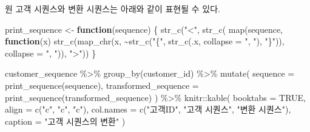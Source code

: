 \documentclass[
]{book}
\newenvironment{Shaded}{\begin{snugshade}}{\end{snugshade}}
\newcommand{\AttributeTok}[1]{\textcolor[rgb]{0.77,0.63,0.00}{#1}}
\newcommand{\ConstantTok}[1]{\textcolor[rgb]{0.00,0.00,0.00}{#1}}
\newcommand{\ControlFlowTok}[1]{\textcolor[rgb]{0.13,0.29,0.53}{\textbf{#1}}}
\newcommand{\FunctionTok}[1]{\textcolor[rgb]{0.00,0.00,0.00}{#1}}
\newcommand{\NormalTok}[1]{#1}
\newcommand{\OtherTok}[1]{\textcolor[rgb]{0.56,0.35,0.01}{#1}}
\newcommand{\SpecialCharTok}[1]{\textcolor[rgb]{0.00,0.00,0.00}{#1}}
\newcommand{\StringTok}[1]{\textcolor[rgb]{0.31,0.60,0.02}{#1}}
\begin{document}
\begin{Shaded}
\end{Shaded}

원 고객 시퀀스와 변환 시퀀스는 아래와 같이 표현될 수 있다.

\begin{Shaded}
\begin{Highlighting}[]
\NormalTok{print\_sequence }\OtherTok{\textless{}{-}} \ControlFlowTok{function}\NormalTok{(sequence) \{}
  \FunctionTok{str\_c}\NormalTok{(}\StringTok{"\textless{}"}\NormalTok{, }\FunctionTok{str\_c}\NormalTok{(}
    \FunctionTok{map}\NormalTok{(sequence, }\ControlFlowTok{function}\NormalTok{(x) }
      \FunctionTok{str\_c}\NormalTok{(}\FunctionTok{map\_chr}\NormalTok{(x, }\SpecialCharTok{\textasciitilde{}}\FunctionTok{str\_c}\NormalTok{(}\StringTok{"\{"}\NormalTok{, }\FunctionTok{str\_c}\NormalTok{(.x, }\AttributeTok{collapse =} \StringTok{", "}\NormalTok{), }\StringTok{"\}"}\NormalTok{)), }
            \AttributeTok{collapse =} \StringTok{", "}\NormalTok{)),}
    \StringTok{"\textgreater{}"}\NormalTok{))}
\NormalTok{\}}

\NormalTok{customer\_sequence }\SpecialCharTok{\%\textgreater{}\%}
  \FunctionTok{group\_by}\NormalTok{(customer\_id) }\SpecialCharTok{\%\textgreater{}\%}
  \FunctionTok{mutate}\NormalTok{(}
    \AttributeTok{sequence =} \FunctionTok{print\_sequence}\NormalTok{(sequence),}
    \AttributeTok{transformed\_sequence =} \FunctionTok{print\_sequence}\NormalTok{(transformed\_sequence)}
\NormalTok{  ) }\SpecialCharTok{\%\textgreater{}\%}
\NormalTok{  knitr}\SpecialCharTok{::}\FunctionTok{kable}\NormalTok{(}
    \AttributeTok{booktabs =} \ConstantTok{TRUE}\NormalTok{,}
    \AttributeTok{align =} \FunctionTok{c}\NormalTok{(}\StringTok{"c"}\NormalTok{, }\StringTok{"c"}\NormalTok{, }\StringTok{"c"}\NormalTok{),}
    \AttributeTok{col.names =} \FunctionTok{c}\NormalTok{(}\StringTok{"고객ID"}\NormalTok{, }\StringTok{"고객 시퀀스"}\NormalTok{, }\StringTok{"변환 시퀀스"}\NormalTok{),}
    \AttributeTok{caption =} \StringTok{"고객 시퀀스의 변환"}
\NormalTok{  )}
\end{Highlighting}
\end{Shaded}
\end{document}
